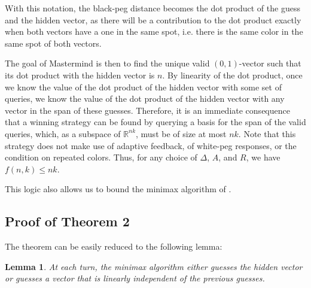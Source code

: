 \documentclass[12pt, a4paper]{article}
\newcommand{\R}{\mathbb{R}}           %
\newtheorem{lemma}{Lemma}
\begin{document}
With this notation, the black-peg distance becomes the dot product of the guess and the hidden vector, as there will be a contribution to the dot product exactly when both vectors have a one in the same spot, i.e. there is the same color in the same spot of both vectors. 

The goal of Mastermind is then to find the unique valid $(0,1)$-vector such that its dot product with the hidden vector is $n$. By linearity of the dot product, once we know the value of the dot product of the hidden vector with some set of queries, we know the value of the dot product of the hidden vector with any vector in the span of these guesses. Therefore, it is an immediate consequence that a winning strategy can be found by querying a basis for the span of the valid queries, which, as a subspace of $\R^{nk}$, must be of size at most $nk$. Note that this strategy does not make use of adaptive feedback, of white-peg responses, or the condition on repeated colors. Thus, for any choice of $\Delta$, $A$, and $R$, we have $f(n,k) \leq nk$.

This logic also allows us to bound the minimax algorithm of \cite{DK76}. 
\subsection{Proof of Theorem 2}
The theorem can be easily reduced to the following lemma:
\begin{lemma}
	At each turn, the minimax algorithm either guesses the hidden vector or guesses a vector that is linearly independent of the previous guesses.
\end{lemma}
\end{document}
